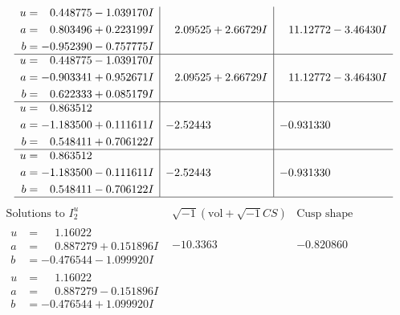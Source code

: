 \documentclass[1p]{elsarticle_modified}
\theoremstyle{definition}
\newcommand{\I}{\sqrt{-1}}
\begin{document}
$$\begin{array}{c|c|c}
\begin{aligned}
u &= \phantom{-}0.448775 - 1.039170 I \\
a &= \phantom{-}0.803496 + 0.223199 I \\
b &= -0.952390 - 0.757775 I\end{aligned}
 & \phantom{-}2.09525 + 2.66729 I & \phantom{-}11.12772 - 3.46430 I \\ \hline\begin{aligned}
u &= \phantom{-}0.448775 - 1.039170 I \\
a &= -0.903341 + 0.952671 I \\
b &= \phantom{-}0.622333 + 0.085179 I\end{aligned}
 & \phantom{-}2.09525 + 2.66729 I & \phantom{-}11.12772 - 3.46430 I \\ \hline\begin{aligned}
u &= \phantom{-}0.863512\phantom{ +0.000000I} \\
a &= -1.183500 + 0.111611 I \\
b &= \phantom{-}0.548411 + 0.706122 I\end{aligned}
 & -2.52443\phantom{ +0.000000I} & -0.931330\phantom{ +0.000000I} \\ \hline\begin{aligned}
u &= \phantom{-}0.863512\phantom{ +0.000000I} \\
a &= -1.183500 - 0.111611 I \\
b &= \phantom{-}0.548411 - 0.706122 I\end{aligned}
 & -2.52443\phantom{ +0.000000I} & -0.931330\phantom{ +0.000000I}\\
 \hline 
 \end{array}$$\newpage$$\begin{array}{c|c|c}  
\text{Solutions to }I^u_{2}& \I (\text{vol} + \sqrt{-1}CS) & \text{Cusp shape}\\
 \hline 
\begin{aligned}
u &= \phantom{-}1.16022\phantom{ +0.000000I} \\
a &= \phantom{-}0.887279 + 0.151896 I \\
b &= -0.476544 - 1.099920 I\end{aligned}
 & -10.3363\phantom{ +0.000000I} & -0.820860\phantom{ +0.000000I} \\ \hline\begin{aligned}
u &= \phantom{-}1.16022\phantom{ +0.000000I} \\
a &= \phantom{-}0.887279 - 0.151896 I \\
b &= -0.476544 + 1.099920 I\end{aligned}

\end{array}$$
\end{document}
